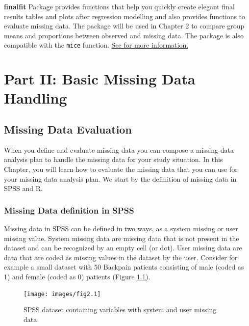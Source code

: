 \documentclass[
]{book}
\begin{document}
\textbf{finalfit}
Package provides functions that help you quickly create elegant final results tables and plots after regression modelling and also provides functions to evaluate missing data. The package will be used in Chapter 2 to compare group means and proportions between observed and missing data. The package is also compatible with the \texttt{mice} function.
\href{https://finalfit.org/index.html}{See for more information.}

\hypertarget{part-part-ii-basic-missing-data-handling}{%
\part{Part II: Basic Missing Data Handling}\label{part-part-ii-basic-missing-data-handling}}

\hypertarget{missing-data-evaluation}{%
\chapter{Missing Data Evaluation}\label{missing-data-evaluation}}

When you define and evaluate missing data you can compose a missing data analysis plan to handle the missing data for your study situation. In this Chapter, you will learn how to evaluate the missing data that you can use for your missing data analysis plan. We start by the definition of missing data in SPSS and R.

\hypertarget{missing-data-definition-in-spss}{%
\section{Missing Data definition in SPSS}\label{missing-data-definition-in-spss}}

Missing data in SPSS can be defined in two ways, as a system missing or user missing value. System missing data are missing data that is not present in the dataset and can be recognized by an empty cell (or dot). User missing data are data that are coded as missing values in the dataset by the user. Consider for example a small dataset with 50 Backpain patients consisting of male (coded as 1) and female (coded as 0) patients (Figure \ref{fig:fig2-1}).

\begin{figure}

{\centering \texttt{[image: images/fig2.1]} 

}

\caption{SPSS dataset containing variables with system and user missing data}\label{fig:fig2-1}
\end{figure}
\end{document}
